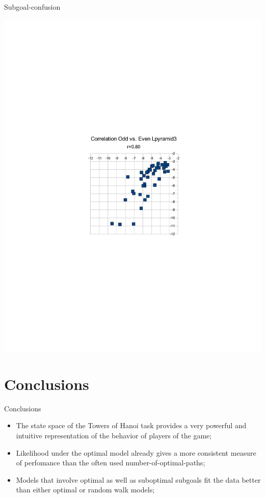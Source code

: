 \documentclass[xcolor=table]{beamer}
\begin{document}
\begin{frame}{Subgoal-confusion}
\centerline{
 \includegraphics[trim= 10cm 10cm 10cm 10cm,height=.8\textheight]{lpyramid3.pdf}}
\end{frame}


\section{Conclusions}
\label{sec:conclusions}

\begin{frame}{Conclusions}
  \begin{itemize}
  \item The state space of the Towers of Hanoi task provides a very powerful and intuitive representation of the behavior of players of the game;
  \item Likelihood under the optimal model already gives a more consistent measure of perfomance than the often used number-of-optimal-paths;
  \item Models that involve optimal as well as suboptimal subgoals fit the data better than either optimal or random walk models;
  \end{itemize}
\end{frame}
\end{document}
